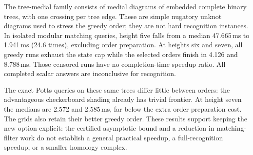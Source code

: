 The tree-medial family consists of medial diagrams of embedded complete
binary trees, with one crossing per tree edge.  These are simple nugatory
unknot diagrams used to stress the greedy order; they are not hard
recognition instances.  In isolated modular matching queries, height five
falls from a median 47.665\,ms to 1.941\,ms (24.6 times), excluding order
preparation.  At heights six and seven, all greedy runs exhaust the state
cap while the selected orders finish in 4.126 and 8.788\,ms.  Those censored
runs have no completion-time speedup ratio.  All completed scalar answers
are inconclusive for recognition.

The exact Potts queries on these same trees differ little between orders:
the advantageous checkerboard shading already has trivial frontier.  At
height seven the medians are 2.572 and 2.585\,ms, far below the extra order
preparation cost.  The grids also retain their better greedy order.  These
results support keeping the new option explicit: the certified asymptotic
bound and a reduction in matching-filter work do not establish a general
practical speedup, a full-recognition speedup, or a smaller homology complex.
